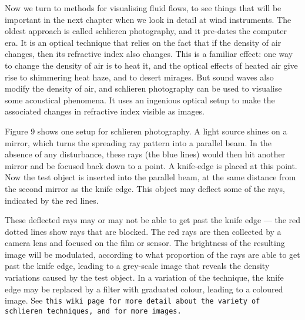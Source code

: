 
  Now we turn to methods for visualising fluid flows, to see things that will 
  be important in the next chapter when we look in detail at wind instruments. 
  The oldest approach is called schlieren photography, and it pre-dates the 
  computer era. It is an optical technique that relies on the fact that if the 
  density of air changes, then its refractive index also changes. This is a 
  familiar effect: one way to change the density of air is to heat it, and the 
  optical effects of heated air give rise to shimmering heat haze, and to 
  desert mirages. But sound waves also modify the density of air, and schlieren 
  photography can be used to visualise some acoustical phenomena. It uses an 
  ingenious optical setup to make the associated changes in refractive index 
  visible as images. 

  Figure 9 shows one setup for schlieren photography. A light source shines on 
  a mirror, which turns the spreading ray pattern into a parallel beam. In the 
  absence of any disturbance, these rays (the blue lines) would then hit 
  another mirror and be focused back down to a point. A knife-edge is placed at 
  this point. Now the test object is inserted into the parallel beam, at the 
  same distance from the second mirror as the knife edge. This object may 
  deflect some of the rays, indicated by the red lines. 

  These deflected rays may or may not be able to get past the knife edge — the 
  red dotted lines show rays that are blocked. The red rays are then collected 
  by a camera lens and focused on the film or sensor. The brightness of the 
  resulting image will be modulated, according to what proportion of the rays 
  are able to get past the knife edge, leading to a grey-scale image that 
  reveals the density variations caused by the test object. In a variation of 
  the technique, the knife edge may be replaced by a filter with graduated 
  colour, leading to a coloured image. See \tt{}this wiki page\rm{} for more 
  detail about the variety of schlieren techniques, and for more images. 

